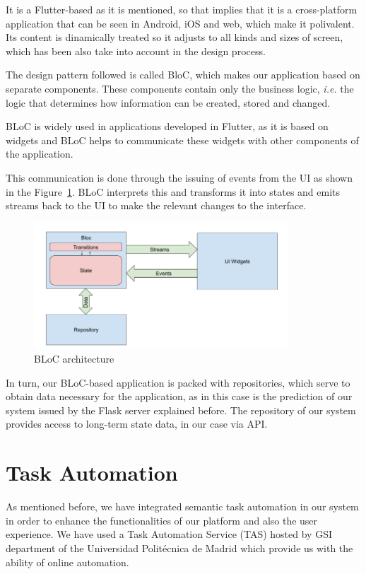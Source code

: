 It is a Flutter-based as it is mentioned, so that implies that it is a cross-platform application that can be seen in Android, iOS and web, which make it polivalent. Its content is dinamically treated so it adjusts to all kinds and sizes of screen, which has been also take into account in the design process.

The design pattern followed is called BloC, which makes our application based on separate components. These components contain only the business logic, \textit{i.e.} the logic that determines how information can be created, stored and changed.

BLoC is widely used in applications developed in Flutter, as it is based on widgets and BLoC helps to communicate these widgets with other components of the application.

This communication is done through the issuing of events from the UI as shown in the Figure~\ref{fig:bloc}. BLoC interprets this and transforms it into states and emits streams back to the UI to make the relevant changes to the interface. 

\begin{figure}[h]
    \centering
    \includegraphics[width=0.85\textwidth]{img/architecture/bloc.png}
    \caption{BLoC architecture}
    \label{fig:bloc}
\end{figure}

In turn, our BLoC-based application is packed with repositories, which serve to obtain data necessary for the application, as in this case is the prediction of our system issued by the Flask server explained before. The repository of our system provides access to long-term state data, in our case via API.

\section{Task Automation}
As mentioned before, we have integrated semantic task automation in our system in order to enhance the functionalities of our platform and also the user experience. We have used a Task Automation Service (TAS) hosted by GSI department of the Universidad Politécnica de Madrid which provide us with the ability of online automation.

